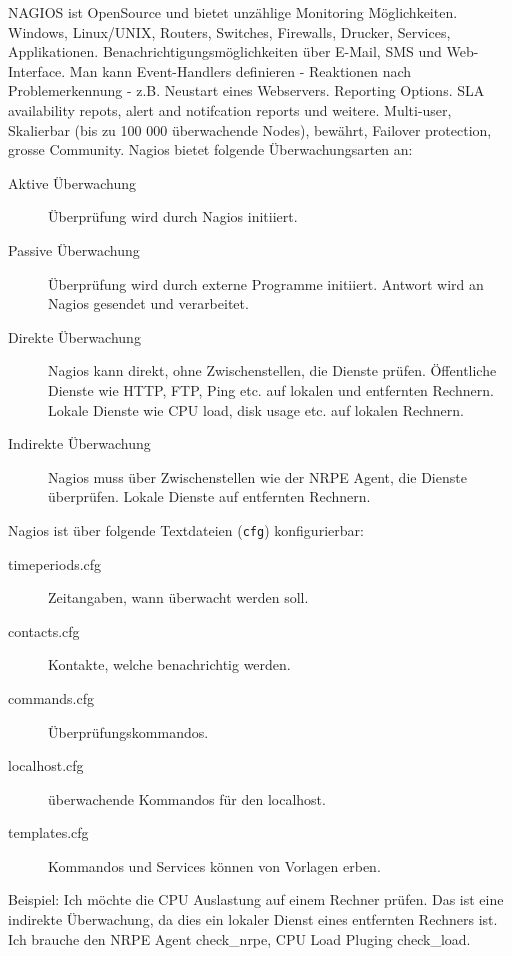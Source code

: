 NAGIOS ist OpenSource und bietet unzählige Monitoring Möglichkeiten. Windows, Linux/UNIX, Routers, Switches, Firewalls, Drucker, Services, Applikationen. Benachrichtigungsmöglichkeiten über E-Mail, SMS und Web-Interface. Man kann Event-Handlers definieren - Reaktionen nach Problemerkennung - z.B. Neustart eines Webservers. Reporting Options. SLA availability repots, alert and notifcation reports und weitere. Multi-user, Skalierbar (bis zu 100 000 überwachende Nodes), bewährt, Failover protection, grosse Community.
Nagios bietet folgende Überwachungsarten an:
\begin{description}
	\item[Aktive Überwachung] Überprüfung wird durch Nagios initiiert.
	\item[Passive Überwachung] Überprüfung wird durch externe Programme initiiert. Antwort wird an Nagios gesendet und verarbeitet.
	\item[Direkte Überwachung] Nagios kann direkt, ohne Zwischenstellen, die Dienste prüfen. Öffentliche Dienste wie HTTP, FTP, Ping etc. auf lokalen und entfernten Rechnern. Lokale Dienste wie CPU load, disk usage etc. auf lokalen Rechnern.
	\item[Indirekte Überwachung] Nagios muss über Zwischenstellen wie der NRPE Agent, die Dienste überprüfen. Lokale Dienste auf entfernten Rechnern.
\end{description}
Nagios ist über folgende Textdateien (\texttt{cfg}) konfigurierbar:
\begin{description}
	\item[timeperiods.cfg] Zeitangaben, wann überwacht werden soll.
	\item[contacts.cfg] Kontakte, welche benachrichtig werden.
	\item[commands.cfg] Überprüfungskommandos. 
	\item[localhost.cfg] überwachende Kommandos für den localhost. 
	\item[templates.cfg] Kommandos und Services können von Vorlagen erben.
\end{description}
Beispiel: Ich möchte die CPU Auslastung auf einem Rechner prüfen. Das ist eine indirekte Überwachung, da dies ein lokaler Dienst eines entfernten Rechners ist. Ich brauche den NRPE Agent check\_nrpe, CPU Load Pluging check\_load. 